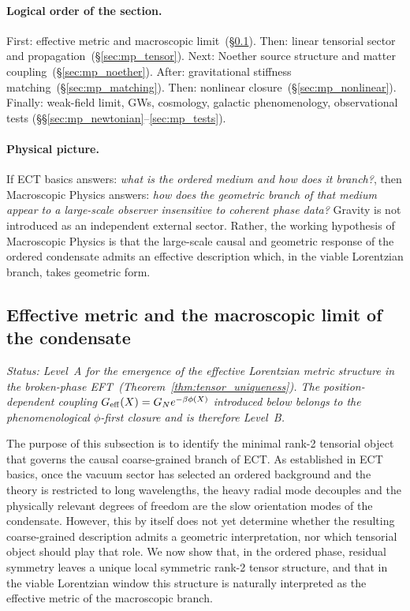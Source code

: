 \documentclass[11pt,a4paper]{article}
\numberwithin{equation}{section}
\begin{document}
\paragraph{Logical order of the section.}
First: effective metric and macroscopic limit~(\S\ref{sec:mp_metric}).
Then: linear tensorial sector and propagation~(\S\ref{sec:mp_tensor}).
Next: Noether source structure and matter coupling~(\S\ref{sec:mp_noether}).
After: gravitational stiffness matching~(\S\ref{sec:mp_matching}).
Then: nonlinear closure~(\S\ref{sec:mp_nonlinear}).
Finally: weak-field limit, GWs, cosmology, galactic
phenomenology, observational tests
(\S\S\ref{sec:mp_newtonian}--\ref{sec:mp_tests}).

\paragraph{Physical picture.}
If ECT basics answers: \emph{what is the ordered medium and how
does it branch?}, then Macroscopic Physics answers:
\emph{how does the geometric branch of that medium appear to a
large-scale observer insensitive to coherent phase data?}
Gravity is not introduced as an independent external sector.
Rather, the working hypothesis of Macroscopic Physics is that the
large-scale causal and geometric response of the ordered condensate
admits an effective description which, in the viable Lorentzian
branch, takes geometric form.

\subsection{Effective metric and the macroscopic limit
of the condensate}
\label{sec:mp_metric}

\textit{Status: Level~A for the emergence of the effective Lorentzian
metric structure in the broken-phase EFT~(Theorem~\ref{thm:tensor_uniqueness}).
The position-dependent coupling $G_{\rm eff}(X)=G_N e^{-\beta\phi(X)}$
introduced below belongs to the phenomenological $\phi$-first closure
and is therefore Level~B.}

\medskip
The purpose of this subsection is to identify the minimal rank-2
tensorial object that governs the causal coarse-grained branch of ECT.
As established in ECT basics, once the vacuum sector has selected an
ordered background and the theory is restricted to long wavelengths,
the heavy radial mode decouples and the physically relevant degrees of
freedom are the slow orientation modes of the condensate.
However, this by itself does not yet determine whether the resulting
coarse-grained description admits a geometric interpretation, nor which
tensorial object should play that role.
We now show that, in the ordered phase, residual symmetry leaves a
unique local symmetric rank-2 tensor structure, and that in the viable
Lorentzian window this structure is naturally interpreted as the
effective metric of the macroscopic branch.
\end{document}

